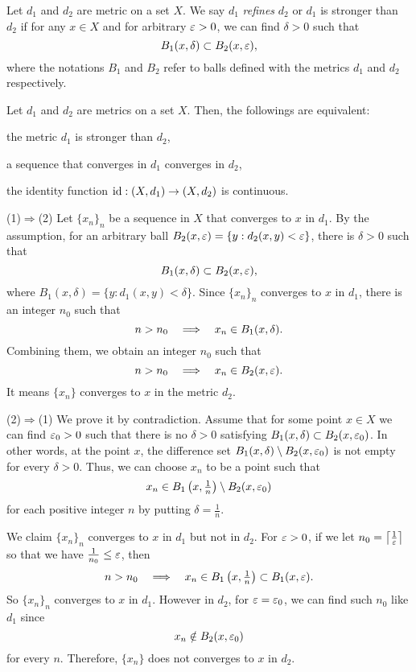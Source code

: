\subsubsection{}

\begin{defn}
Let $d_1$ and $d_2$ are metric on a set $X$.
We say $d_1$ \emph{refines} $d_2$ or $d_1$ is stronger than $d_2$ if for any $x\in X$ and for arbitrary $\varepsilon>0$, we can find $\delta>0$ such that
\[B_1(x,\delta)\subset B_2(x,\varepsilon),\]
where the notations $B_1$ and $B_2$ refer to balls defined with the metrics $d_1$ and $d_2$ respectively.
\end{defn}



\begin{prop}
Let $d_1$ and $d_2$ are metrics on a set $X$.
Then, the followings are equivalent:
\begin{cond}
\item the metric $d_1$ is stronger than $d_2$,
\item a sequence that converges in $d_1$ converges in $d_2$,
\item the identity function $\id:(X,d_1)\to(X,d_2)$ is continuous.
\end{cond}
\end{prop}
\begin{pf}
(1)$\Rightarrow$(2)
Let $\{x_n\}_n$ be a sequence in $X$ that converges to $x$ in $d_1$.
By the assumption, for an arbitrary ball $B_2(x,\varepsilon)=\{y:d_2(x,y)<\varepsilon\}$, there is $\delta>0$ such that
\[B_1(x,\delta)\subset B_2(x,\varepsilon),\]
where $B_1(x,\delta)=\{y:d_1(x,y)<\delta\}$.
Since $\{x_n\}_n$ converges to $x$ in $d_1$, there is an integer $n_0$ such that
\[n>n_0\impl x_n\in B_1(x,\delta).\]
Combining them, we obtain an integer $n_0$ such that
\[n>n_0\impl x_n\in B_2(x,\e).\]
It means $\{x_n\}$ converges to $x$ in the metric $d_2$.

(2)$\Rightarrow$(1)
We prove it by contradiction.
Assume that for some point $x\in X$ we can find $\varepsilon_0>0$ such that there is no $\delta>0$ satisfying $B_1(x,\delta)\subset B_2(x,\varepsilon_0)$.
In other words, at the point $x$, the difference set $B_1(x,\delta)\setminus B_2(x,\varepsilon_0)$ is not empty for every $\delta>0$.
Thus, we can choose $x_n$ to be a point such that
\[x_n\in B_1\left(x,\tfrac1n\right)\setminus B_2(x,\varepsilon_0)\]
for each positive integer $n$ by putting $\delta=\frac1n$.

We claim $\{x_n\}_n$ converges to $x$ in $d_1$ but not in $d_2$.
For $\varepsilon>0$, if we let $n_0=\left\lceil\frac1{\varepsilon}\right\rceil$ so that we have $\frac1{n_0}\le\varepsilon$, then
\[n>n_0\impl x_n\in B_1\left(x,\tfrac1n\right)\subset B_1(x,\e).\]
So $\{x_n\}_n$ converges to $x$ in $d_1$.
However in $d_2$, for $\varepsilon=\varepsilon_0$, we can find such $n_0$ like $d_1$ since
\[x_n\notin B_2(x,\varepsilon_0)\]
for every $n$.
Therefore, $\{x_n\}$ does not converges to $x$ in $d_2$.
\end{pf}










